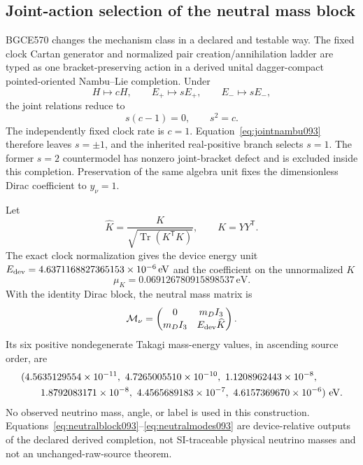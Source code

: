 \documentclass[11pt]{article}
\theoremstyle{definition}
\theoremstyle{remark}
\newcommand{\Tr}{\operatorname{Tr}}
\begin{document}
\subsection{Joint-action selection of the neutral mass block}

BGCE570 changes the mechanism class in a declared and testable way. The fixed clock Cartan generator and normalized pair creation/annihilation ladder are typed as one bracket-preserving action in a derived unital dagger-compact pointed-oriented Nambu--Lie completion. Under
\begin{equation}
 H\longmapsto cH,
 \qquad
 E_+\longmapsto sE_+,
 \qquad
 E_-\longmapsto sE_-,
\end{equation}
the joint relations reduce to
\begin{equation}
 s(c-1)=0,
 \qquad
 s^2=c.
 \label{eq:jointnambu093}
\end{equation}
The independently fixed clock rate is $c=1$. Equation~\eqref{eq:jointnambu093} therefore leaves $s=\pm1$, and the inherited real-positive branch selects $s=1$. The former $s=2$ countermodel has nonzero joint-bracket defect and is excluded inside this completion. Preservation of the same algebra unit fixes the dimensionless Dirac coefficient to $y_\nu=1$.

Let
\begin{equation}
 \widehat K=\frac{K}{\sqrt{\Tr(K^{\mathsf T}K)}},
 \qquad K=YY^{\mathsf T}.
\end{equation}
The exact clock normalization gives the device energy unit $E_{\rm dev}=4.6371168827365153\times10^{-6}\,\mathrm{eV}$ and the coefficient on the unnormalized $K$
\begin{equation}
 \mu_K=0.069126780915898537\,\mathrm{eV}.
\end{equation}
With the identity Dirac block, the neutral mass matrix is
\begin{equation}
 \mathcal M_\nu=
 \begin{pmatrix}
  0&m_DI_3\\
  m_DI_3&E_{\rm dev}\widehat K
 \end{pmatrix}.
 \label{eq:neutralblock093}
\end{equation}
Its six positive nondegenerate Takagi mass-energy values, in ascending source order, are
\begin{equation}
 \begin{split}
 &(4.5635129554\times10^{-11},\ 4.7265005510\times10^{-10},\
 1.1208962443\times10^{-8},\\
 &\hspace{2.0em}1.8792083171\times10^{-8},\ 4.4565689183\times10^{-7},\
 4.6157369670\times10^{-6})\ \mathrm{eV}.
 \end{split}
 \label{eq:neutralmodes093}
\end{equation}
No observed neutrino mass, angle, or label is used in this construction. Equations~\eqref{eq:neutralblock093}--\eqref{eq:neutralmodes093} are device-relative outputs of the declared derived completion, not SI-traceable physical neutrino masses and not an unchanged-raw-source theorem.
\end{document}
